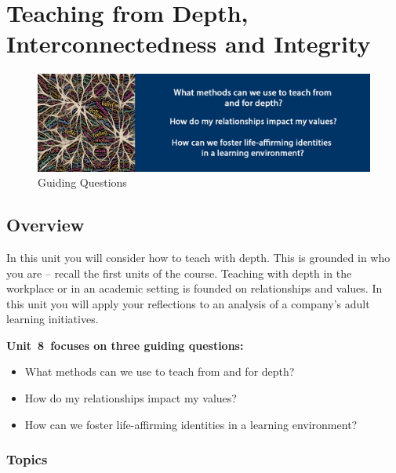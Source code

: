 \documentclass[
]{book}
\providecommand{\tightlist}{%
  \setlength{\itemsep}{0pt}\setlength{\parskip}{0pt}}
\begin{document}
\hypertarget{teaching-from-depth-interconnectedness-and-integrity}{%
\chapter{Teaching from Depth, Interconnectedness and Integrity}\label{teaching-from-depth-interconnectedness-and-integrity}}

\begin{figure}
\centering
\includegraphics{assets/unit8/BannerUnit8.jpg}
\caption{Guiding Questions}
\end{figure}

\hypertarget{overview-7}{%
\section*{Overview}\label{overview-7}}

In this unit you will consider how to teach with depth. This is grounded in who you are -- recall the first units of the course. Teaching with depth in the workplace or in an academic setting is founded on relationships and values. In this unit you will apply your reflections to an analysis of a company's adult learning initiatives.

\textbf{Unit~8~focuses on three guiding questions:}

\begin{itemize}
\tightlist
\item
  What methods can we use to teach from and for depth?\\
\item
  How do my relationships impact my values?\\
\item
  How can we foster life-affirming identities in a learning environment?
\end{itemize}

\hypertarget{topics-7}{%
\subsection*{Topics}\label{topics-7}}
\end{document}
